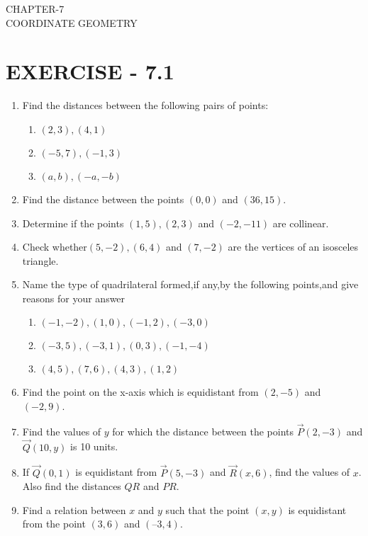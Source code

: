 \documentclass[12pt]{article}
\begin{document}
\begin{center}
\textbf\large{CHAPTER-7 \\ COORDINATE GEOMETRY}
\end{center}

\section{EXERCISE - 7.1}
\fi
\begin{enumerate}[label=\thesection.\arabic*,ref=\thesection.\theenumi]
\item Find the distances between the following pairs of points:
\begin{enumerate}
\item $(2,3),(4,1)$
\item $(-5,7),(-1,3)$
\item $(a,b),(-a,-b)$
\end{enumerate}
\item Find the distance between the points $(0,0)$ and $ (36,15)$.
\item Determine if the points $(1,5),(2,3)$ and $(-2,-11)$ are collinear.
\item Check whether$(5,-2),(6,4)$ and $(7,-2)$ are the vertices of an isosceles triangle.
	\iffalse
\item  In a classroom, 4 friends are seated at the points A,B,C and D as shown in Fig. 7.8, Champa and Chameli walk in to the class and after observing for a few minutes Champa asks Chameli,"Dont't you think ABCD is a square?" Chameli disagrees,Using distance formula, find which of them is correct.

\begin{figure}[!h]
\centering
  \texttt{[image: canvas.jpg]}
 \caption{}
\label{fig:10/7/4/8Fig3}
\end{figure}
\fi
\item Name the type of quadrilateral formed,if any,by the following points,and give reasons for your answer
\begin{enumerate}
\item $(-1,-2),(1,0),(-1,2),(-3,0)$
\item $(-3,5),(-3,1),(0,3),(-1,-4)$
\item $(4,5),(7,6),(4,3),(1,2)$
\end{enumerate}
\item Find the point on the x-axis which is equidistant from $(2,-5)$ and $(-2,9)$.
\item Find the values of $y$ for which the distance between the points                  $\vec{P}(2,-3)$ and $\vec{Q}(10,y)$ is 10 units.
\item  If $\vec{Q}(0, 1)$ is equidistant from $\vec{P}(5, -3)$ and $\vec{R}(x, 6)$, find the values of $x$. Also find the
distances $QR$ and $PR$.
\item  Find a relation between $x$ and $y$ such that the point $(x,y)$ is equidistant from the point
$(3, 6)$ and $(– 3, 4)$.

\end{enumerate}
\end{document}
